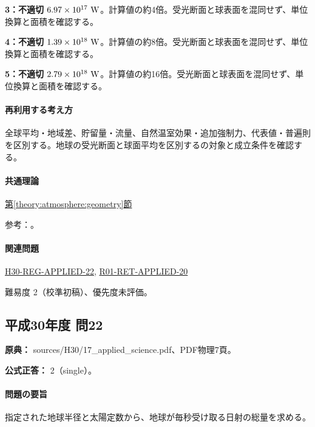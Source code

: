\noindent\textbf{3：不適切} \(6.97\times10^{17}\ {\rm W}\)。計算値の約4倍。受光断面と球表面を混同せず、単位換算と面積を確認する。\par

\noindent\textbf{4：不適切} \(1.39\times10^{18}\ {\rm W}\)。計算値の約8倍。受光断面と球表面を混同せず、単位換算と面積を確認する。\par

\noindent\textbf{5：不適切} \(2.79\times10^{18}\ {\rm W}\)。計算値の約16倍。受光断面と球表面を混同せず、単位換算と面積を確認する。\par

\paragraph{再利用する考え方} 全球平均・地域差、貯留量・流量、自然温室効果・追加強制力、代表値・普遍則を区別する。地球の受光断面と球面平均を区別するの対象と成立条件を確認する。

\paragraph{共通理論} \hyperref[theory:atmosphere:geometry]{第\ref*{theory:atmosphere:geometry}節}

\par 参考：\cite{atm_nasa_budget}。

\paragraph{関連問題} \hyperref[q:h30-reg-applied-22]{H30-REG-APPLIED-22}, \hyperref[q:r01-ret-applied-20]{R01-RET-APPLIED-20}

\par 難易度 2（校準初稿）、優先度未評価。

\subsection{平成30年度 問22}
\label{q:h30-reg-applied-22}

\noindent\textbf{原典：} sources/H30/17\_applied\_science.pdf、PDF物理7頁。

\textbf{公式正答：} 2（single）。

\paragraph{問題の要旨} 指定された地球半径と太陽定数から、地球が毎秒受け取る日射の総量を求める。

